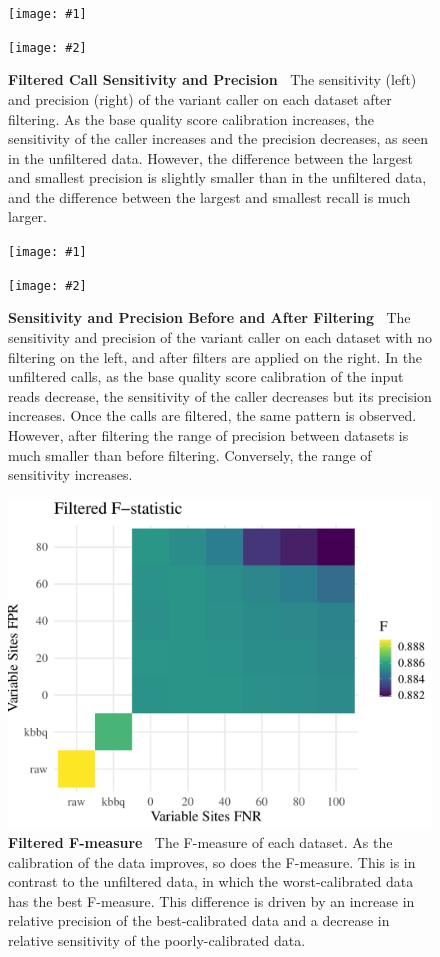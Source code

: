 \documentclass{report}
\newcommand{\titlecaption}[2]{\caption[#1]{\textbf{#1 \textbar\,} #2}}
\newcommand{\includetwo}[2]{\begin{minipage}{.475\textwidth}%
\texttt{[image: \#1]}%
\end{minipage}\hfill\begin{minipage}{.475\textwidth}%
\texttt{[image: \#2]}%
\end{minipage}}
\begin{document}

\begin{figure}
\centering
\includetwo{flt_sensitivity.pdf}{flt_precision.pdf}
\titlecaption{Filtered Call Sensitivity and Precision}{The sensitivity (left) and precision (right) of the variant caller on each dataset after filtering. As the base quality score calibration increases, the sensitivity of the caller increases and the precision decreases, as seen in the unfiltered data. However, the difference between the largest and smallest precision is slightly smaller than in the unfiltered data, and the difference between the largest and smallest recall is much larger.}
\label{fig:vc_flt_sp}
\end{figure}

\begin{figure}
\centering
\includetwo{sens_precision.pdf}{flt_sens_precision.pdf}
\titlecaption{Sensitivity and Precision Before and After Filtering}{The sensitivity and precision of the variant caller on each dataset with no filtering on the left, and after filters are applied on the right. In the unfiltered calls, as the base quality score calibration of the input reads decrease, the sensitivity of the caller decreases but its precision increases. Once the calls are filtered, the same pattern is observed. However, after filtering the range of precision between datasets is much smaller than before filtering. Conversely, the range of sensitivity increases.}
\label{fig:vc_sens_prec}
\end{figure}

\begin{figure}
\centering
\includegraphics[width=.7\linewidth]{flt_f_heatmap.pdf}
\titlecaption{Filtered F-measure}{The F-measure of each dataset. As the calibration of the data improves, so does the F-measure. This is in contrast to the unfiltered data, in which the worst-calibrated data has the best F-measure. This difference is driven by an increase in relative precision of the best-calibrated data and a decrease in relative sensitivity of the poorly-calibrated data.}
\label{fig:vc_flt_f}
\end{figure}
\end{document}
